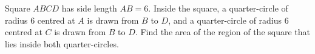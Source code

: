 Square $ABCD$ has side length $AB=6$. Inside the square, a quarter-circle of radius $6$ centred at $A$ is drawn from $B$ to $D$, and a quarter-circle of radius $6$ centred at $C$ is drawn from $B$ to $D$. Find the area of the region of the square that lies inside both quarter-circles.
